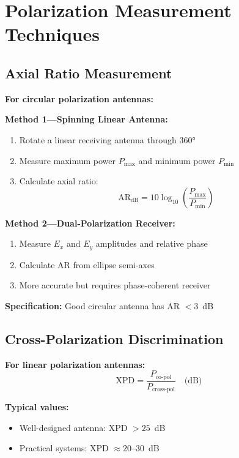 \section{Polarization Measurement Techniques}

\subsection{Axial Ratio Measurement}

\textbf{For circular polarization antennas:}

\textbf{Method 1---Spinning Linear Antenna:}
\begin{enumerate}
\item Rotate a linear receiving antenna through $360°$
\item Measure maximum power $P_{\text{max}}$ and minimum power $P_{\text{min}}$
\item Calculate axial ratio:
\begin{equation}
\mathrm{AR}_{\text{dB}} = 10\log_{10}\left(\frac{P_{\text{max}}}{P_{\text{min}}}\right)
\label{eq:ar-measurement}
\end{equation}
\end{enumerate}

\textbf{Method 2---Dual-Polarization Receiver:}
\begin{enumerate}
\item Measure $E_x$ and $E_y$ amplitudes and relative phase
\item Calculate AR from ellipse semi-axes
\item More accurate but requires phase-coherent receiver
\end{enumerate}

\textbf{Specification:} Good circular antenna has AR $< 3$~dB

\subsection{Cross-Polarization Discrimination}

\textbf{For linear polarization antennas:}
\begin{equation}
\mathrm{XPD} = \frac{P_{\text{co-pol}}}{P_{\text{cross-pol}}} \quad \text{(dB)}
\end{equation}

\textbf{Typical values:}
\begin{itemize}
\item Well-designed antenna: XPD $> 25$~dB
\item Practical systems: XPD $\approx 20$--30~dB
\end{itemize}

